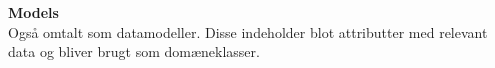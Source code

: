 \textbf{Models}\\
Også omtalt som datamodeller. Disse indeholder blot attributter med relevant data og bliver brugt som domæneklasser.\\\\